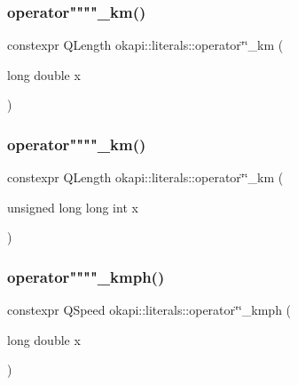 \mbox{\label{namespaceokapi_1_1literals_a32c66d1c5e1e1c23bd588e68ae430ecd}} 
\subsubsection{\texorpdfstring{operator""""\_km()}{operator""\_km()}\hspace{0.1cm}{\footnotesize\ttfamily [1/2]}}
{\footnotesize\ttfamily constexpr Q\+Length okapi\+::literals\+::operator\char`\"{}\char`\"{}\+\_\+km (\begin{DoxyParamCaption}\item[{long double}]{x }\end{DoxyParamCaption})}

\mbox{\label{namespaceokapi_1_1literals_a820d5a94f0ca54b6f65ca1191801fae0}} 
\subsubsection{\texorpdfstring{operator""""\_km()}{operator""\_km()}\hspace{0.1cm}{\footnotesize\ttfamily [2/2]}}
{\footnotesize\ttfamily constexpr Q\+Length okapi\+::literals\+::operator\char`\"{}\char`\"{}\+\_\+km (\begin{DoxyParamCaption}\item[{unsigned long long int}]{x }\end{DoxyParamCaption})}

\mbox{\label{namespaceokapi_1_1literals_a811760fb986149d719b1f0f37d2bff7c}} 
\subsubsection{\texorpdfstring{operator""""\_kmph()}{operator""\_kmph()}\hspace{0.1cm}{\footnotesize\ttfamily [1/2]}}
{\footnotesize\ttfamily constexpr Q\+Speed okapi\+::literals\+::operator\char`\"{}\char`\"{}\+\_\+kmph (\begin{DoxyParamCaption}\item[{long double}]{x }\end{DoxyParamCaption})}

